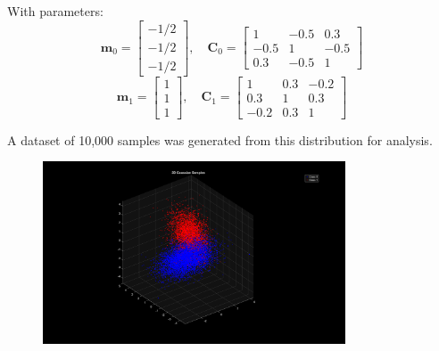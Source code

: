 \documentclass[12pt]{article}
\begin{document}
With parameters:
\[
\mathbf{m}_{0} = \begin{bmatrix} -1/2 \\ -1/2 \\ -1/2 \end{bmatrix}, \quad
\mathbf{C}_{0} = \begin{bmatrix} 1 & -0.5 & 0.3 \\ -0.5 & 1 & -0.5 \\ 0.3 & -0.5 & 1 \end{bmatrix}
\]
\[
\mathbf{m}_{1} = \begin{bmatrix} 1 \\ 1 \\ 1 \end{bmatrix}, \quad
\mathbf{C}_{1} = \begin{bmatrix} 1 & 0.3 & -0.2 \\ 0.3 & 1 & 0.3 \\ -0.2 & 0.3 & 1 \end{bmatrix}
\]

A dataset of 10,000 samples was generated from this distribution for analysis.
\begin{figure}[H]
    \centering
    \includegraphics[width=0.8\textwidth]{gaussian_classes.png}
    \label{fig:gaussian_classes}
\end{figure}



\newpage

\end{document}
